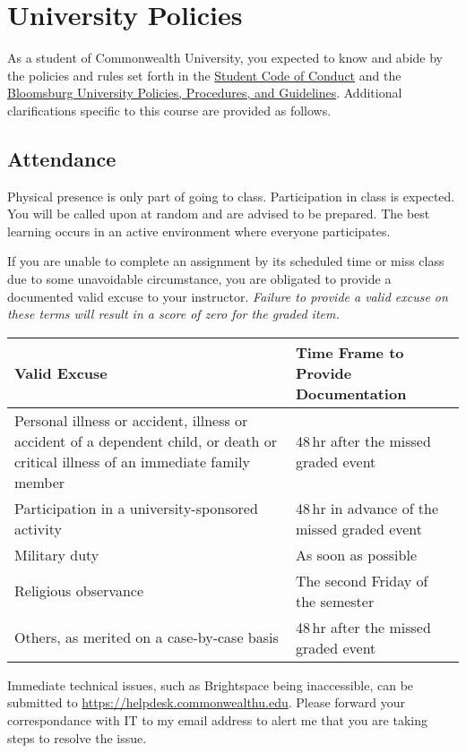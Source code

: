 \documentclass[11pt,letterpaper]{article}
\begin{document}
\section{University Policies}
As a student of Commonwealth University, you expected to know and abide by the
policies and rules set forth in the
\href{https://www.commonwealthu.edu/student-handbook/code-of-conduct}{Student
Code of Conduct} and the
\href{https://www.bloomu.edu/about/administration-and-governance/policies}{Bloomsburg
	University Policies, Procedures, and Guidelines}. Additional
	clarifications specific to this course are provided as follows.

\subsection{Attendance}
Physical presence is only part of going to class. Participation in class is
expected. You will be called upon at random and are advised to be prepared.
The best learning occurs in an active environment where everyone participates.

If you are unable to complete an assignment by its scheduled time or miss class
due to some unavoidable circumstance, you are obligated to provide a documented
valid excuse to your instructor. \emph{Failure to provide a valid excuse on
	these terms will result in a score of zero for the graded item.}

	\begin{center}
		\renewcommand\arraystretch{1.25}
\begin{tabularx}{\linewidth} {X X}
	\toprule
	\bfseries Valid Excuse & \bfseries Time Frame to Provide Documentation
	\\ \midrule
	Personal illness or accident, illness or accident of a dependent child,
	or death or critical illness of an immediate family member &
	48\,hr after the missed graded event \\
	Participation in a university-sponsored activity &
	48\,hr in advance of the missed graded event \\
	Military duty & As soon as possible \\
	Religious observance & The second Friday of the semester \\
	Others, as merited on a case-by-case basis & 48\,hr after the
	missed graded event \\
	\bottomrule
\end{tabularx}
\end{center}

Immediate technical issues, such as Brightspace being inaccessible, can be submitted to
\url{https://helpdesk.commonwealthu.edu}. Please forward your correspondance
with IT to my email address to alert me that you are taking steps to resolve the issue.
\end{document}
